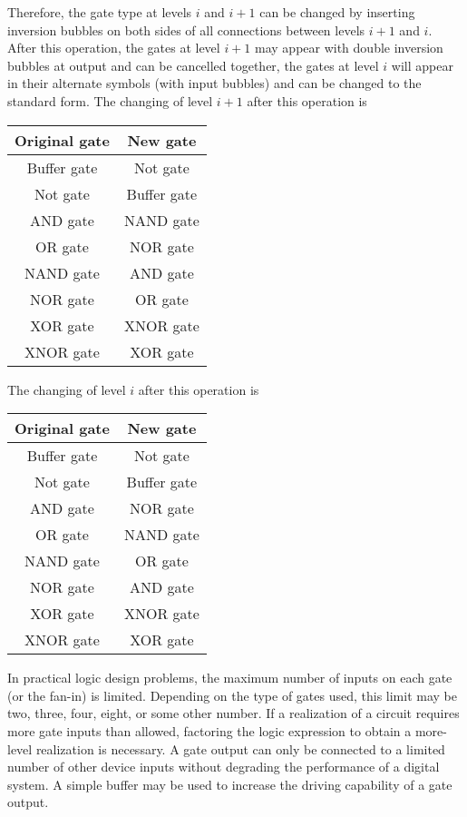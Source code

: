 \documentclass[a4paper,12pt]{article}
\begin{document}
\begin{itemize}
\begin{itemize}
\begin{itemize}
\begin{itemize}
\begin{itemize}
\begin{itemize}
\begin{itemize}
Therefore, the gate type at levels $i$ and $i+1$ can be changed by inserting inversion bubbles on both sides of all connections between levels $i+1$ and $i$. After this operation, the gates at level $i+1$ may appear with double inversion bubbles at output and can be cancelled together, the gates at level $i$ will appear in their alternate symbols (with input bubbles) and can be changed to the standard form. The changing of level $i+1$ after this operation is
\begin{longtable}[c]{|c|c|}
\hline
Original gate & New gate \\\hline\endhead
Buffer gate & Not gate \\\hline
Not gate & Buffer gate \\\hline
AND gate & NAND gate \\\hline
OR gate & NOR gate \\\hline
NAND gate & AND gate \\\hline
NOR gate & OR gate \\\hline
XOR gate & XNOR gate \\\hline
XNOR gate & XOR gate \\\hline
\end{longtable}
The changing of level $i$ after this operation is
\begin{longtable}[c]{|c|c|}
\hline
Original gate & New gate \\\hline\endhead
Buffer gate & Not gate \\\hline
Not gate & Buffer gate \\\hline
AND gate & NOR gate \\\hline
OR gate & NAND gate \\\hline
NAND gate & OR gate \\\hline
NOR gate & AND gate \\\hline
XOR gate & XNOR gate \\\hline
XNOR gate & XOR gate \\\hline
\end{longtable}
In practical logic design problems, the maximum number of inputs on each gate (or the fan-in) is limited. Depending on the type of gates used, this limit may be two, three, four, eight, or some other number. If a realization of a circuit requires more gate inputs than allowed, factoring the logic expression to obtain a more-level realization is necessary.
A gate output can only be connected to a limited number of other device inputs without degrading the performance of a digital system. A simple buffer may be used to increase the driving capability of a gate output.

\end{itemize}
\end{itemize}
\end{itemize}
\end{itemize}
\end{itemize}
\end{itemize}
\end{itemize}
\end{document}
